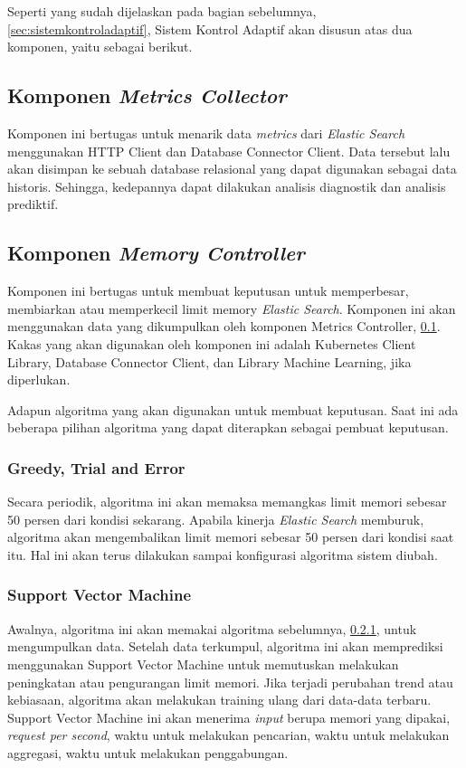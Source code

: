 Seperti yang sudah dijelaskan pada bagian sebelumnya, \ref{sec:sistemkontroladaptif}, Sistem Kontrol Adaptif akan disusun atas dua komponen, yaitu sebagai berikut.
\subsection{Komponen \textit{Metrics Collector}}
\label{sec:metricscontroller}

Komponen ini bertugas untuk menarik data \textit{metrics} dari \textit{Elastic Search} menggunakan HTTP Client dan Database Connector Client. Data tersebut lalu akan disimpan ke sebuah database relasional yang dapat digunakan sebagai data historis. Sehingga, kedepannya dapat dilakukan analisis diagnostik dan analisis prediktif.

\subsection{Komponen \textit{Memory Controller}}

Komponen ini bertugas untuk membuat keputusan untuk memperbesar, membiarkan atau memperkecil limit memory \textit{Elastic Search}. Komponen ini akan menggunakan data yang dikumpulkan oleh komponen Metrics Controller, \ref{sec:metricscontroller}. Kakas yang akan digunakan oleh komponen ini adalah Kubernetes Client Library, Database Connector Client, dan Library Machine Learning, jika diperlukan.

Adapun algoritma yang akan digunakan untuk membuat keputusan. Saat ini ada beberapa pilihan algoritma yang dapat diterapkan sebagai pembuat keputusan.

\subsubsection{Greedy, Trial and Error}
\label{sec:greedytrialerror}

Secara periodik, algoritma ini akan memaksa memangkas limit memori sebesar 50 persen dari kondisi sekarang.
Apabila kinerja \textit{Elastic Search} memburuk, algoritma akan mengembalikan limit memori sebesar 50 persen dari kondisi saat itu.
Hal ini akan terus dilakukan sampai konfigurasi algoritma sistem diubah.

\subsubsection{Support Vector Machine}

Awalnya, algoritma ini akan memakai algoritma sebelumnya, \ref{sec:greedytrialerror}, untuk mengumpulkan data.
Setelah data terkumpul, algoritma ini akan memprediksi menggunakan  Support Vector Machine untuk memutuskan melakukan peningkatan atau pengurangan limit memori.
Jika terjadi perubahan trend atau kebiasaan, algoritma akan melakukan training ulang dari data-data terbaru.
Support Vector Machine ini akan menerima \textit{input} berupa memori yang dipakai, \textit{request per second}, waktu untuk melakukan pencarian, waktu untuk melakukan aggregasi, waktu untuk melakukan penggabungan.